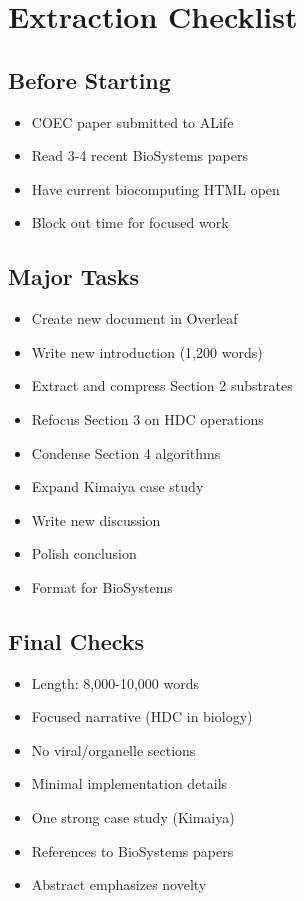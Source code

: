 \documentclass[11pt]{article}
\begin{document}
\section{Extraction Checklist}

\subsection{Before Starting}
\begin{itemize}[label=$\square$]
    \item COEC paper submitted to ALife
    \item Read 3-4 recent BioSystems papers
    \item Have current biocomputing HTML open
    \item Block out time for focused work
\end{itemize}

\subsection{Major Tasks}
\begin{itemize}[label=$\square$]
    \item Create new document in Overleaf
    \item Write new introduction (1,200 words)
    \item Extract and compress Section 2 substrates
    \item Refocus Section 3 on HDC operations
    \item Condense Section 4 algorithms
    \item Expand Kimaiya case study
    \item Write new discussion
    \item Polish conclusion
    \item Format for BioSystems
\end{itemize}

\subsection{Final Checks}
\begin{itemize}[label=$\square$]
    \item Length: 8,000-10,000 words
    \item Focused narrative (HDC in biology)
    \item No viral/organelle sections
    \item Minimal implementation details
    \item One strong case study (Kimaiya)
    \item References to BioSystems papers
    \item Abstract emphasizes novelty
\end{itemize}
\end{document}
